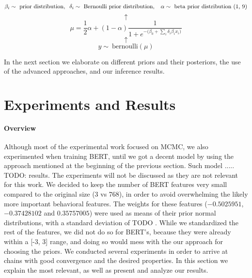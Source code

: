 \documentclass[man, floatsintext, 10pt]{apa6}
\begin{document}
 \[\beta_i \sim \text{ prior distribution}, \hspace{2mm} \delta_i \sim \text{ Bernoulli prior distribution}, \hspace{2mm}\  \alpha \sim \text{ beta prior distribution (1, 9)} \] \[ \uparrow \] \[ \mu = \frac{1}{2} \alpha + (1 - \alpha) \frac{1}{1 + e^{-\big(\beta_0 + \sum_i \delta_i \beta_i x_i \big)}} \] \vspace{0.01mm}  \[ \uparrow \] \[ y \sim\ \text{bernoulli} (\mu) \]
 
In the next section we elaborate on different priors and their posteriors, the use of the advanced approaches, and our inference results.

\section{Experiments and Results}

\paragraph{Overview} Although most of the experimental work focused on MCMC, we also experimented when training BERT, until we got a decent model by using the approach mentioned at the beginning of the previous section. Such model ..... TODO: results. The experiments will not be discussed as they are not relevant for this work. We decided to keep the number of BERT features very small compared to the original size (3 vs 768), in order to avoid overwhelming the likely more important behavioral features. The weights for these features ($-0.5025951$, $-0.37428102$ and $0.35757005$) were used as means of their prior normal distributions, with a standard deviation of TODO . While we standardized the rest of the features, we did not do so for BERT's, because they were already within a [-3, 3] range, and doing so would mess with the our approach for choosing the priors. We conducted several experiments in order to arrive at chains with good convergence and the desired properties. In this section we explain the most relevant, as well as present and analyze our results. 

\vspace{2mm}
\end{document}
